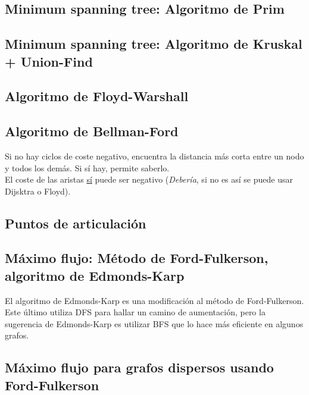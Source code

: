 \documentclass[10pt,letterpaper,twocolumn,twosided]{article}
\newcommand{\codigofuente}[1]{

\dotfill
}
\begin{document}
\subsection{Minimum spanning tree: Algoritmo de Prim}

\codigofuente{./src/grafos/prim.cpp}

\subsection{Minimum spanning tree: Algoritmo de Kruskal + Union-Find}
\codigofuente{./src/grafos/kruskal.cpp}

\subsection{Algoritmo de Floyd-Warshall}
\codigofuente{./src/grafos/floyd.cpp}

\subsection{Algoritmo de Bellman-Ford}
Si no hay ciclos de coste negativo, encuentra la distancia más corta
entre un nodo y todos los demás. Si sí hay, permite saberlo. \\ El
coste de las aristas \underline{sí} puede ser negativo
(\emph{Debería}, si no es así se puede usar Dijsktra o Floyd).
\codigofuente{./src/grafos/bellman.cpp}

\subsection{Puntos de articulación}
\codigofuente{./src/grafos/puntos_articulacion.cpp}

\subsection{Máximo flujo: Método de Ford-Fulkerson, algoritmo de Edmonds-Karp}
El algoritmo de Edmonds-Karp es una modificación al método de Ford-Fulkerson. Este último
utiliza DFS para hallar un camino de aumentación, pero la sugerencia de Edmonds-Karp
es utilizar BFS que lo hace más eficiente en algunos grafos.
\medskip

\codigofuente{./src/grafos/ford_fulkerson.cpp}

\subsection{Máximo flujo para grafos dispersos usando Ford-Fulkerson}
\end{document}
